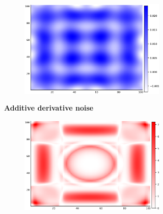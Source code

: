 \documentclass{article}
\numberwithin{equation}{section}
\begin{document}
\begin{figure}
\begin{subfigure}[b]{.5\textwidth}
\begin{subfigure}[b]{.5\textwidth}
      \end{subfigure}%
      \begin{subfigure}[b]{.5\textwidth}
        \centering
        \includegraphics[scale=0.27]{figures/heatmaps/variance-noisy-25.png}
      \end{subfigure}
      \caption{\textbf{Additive derivative noise}}
    \end{subfigure}%
    \begin{subfigure}[b]{.5\textwidth}
      \centering
      \begin{subfigure}[b]{.5\textwidth}
        \centering
        \includegraphics[scale=0.27]{figures/heatmaps/error-length-25.png}
      \end{subfigure}%
      \begin{subfigure}[b]{.5\textwidth}
        \centering

\end{subfigure}
\end{subfigure}
\end{figure}
\end{document}
